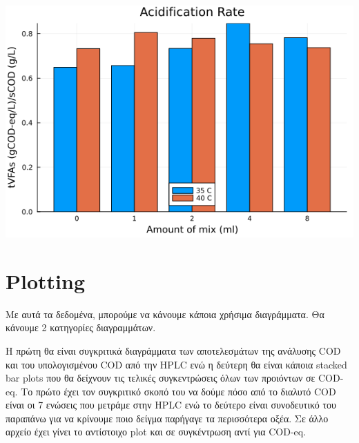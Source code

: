 \documentclass[11pt]{article}
\begin{document}
\begin{center}
\includegraphics[width=.9\linewidth]{../plots/35_40_comp/acidification_comp.png}
\end{center}

\section{Plotting}
\label{sec:org75df20b}
Με αυτά τα δεδομένα, μπορούμε να κάνουμε κάποια χρήσιμα διαγράμματα. Θα κάνουμε 2 κατηγορίες διαγραμμάτων.

Η πρώτη θα είναι συγκριτικά διαγράμματα των αποτελεσμάτων της ανάλυσης COD και του υπολογισμένου COD από την HPLC ενώ η δεύτερη θα είναι κάποια stacked bar plots που θα δείχνουν τις τελικές συγκεντρώσεις όλων των προιόντων σε COD-eq. Το πρώτο έχει τον συγκριτικό σκοπό του να δούμε πόσο από το διαλυτό COD είναι οι 7 ενώσεις που μετράμε στην HPLC ενώ το δεύτερο είναι συνοδευτικό του παραπάνω για να κρίνουμε ποιο δείγμα παρήγαγε τα περισσότερα οξέα. Σε άλλο αρχείο έχει γίνει το αντίστοιχο plot και σε συγκέντρωση αντί για COD-eq.
\end{document}

